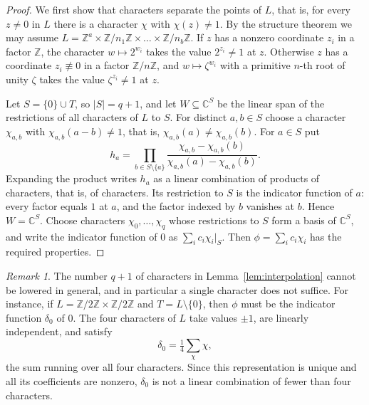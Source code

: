 \documentclass{amsart}
\theoremstyle{definition}
\theoremstyle{remark}
\newtheorem{remark}[theorem]{Remark}
\newcommand{\C}{\mathbb{C}}
\newcommand{\Z}{\mathbb{Z}}
\begin{document}
\begin{proof}
We first show that characters separate the points of $L$, that is, for every $z\ne0$ in $L$ there is a character $\chi$ with $\chi(z)\ne1$. By the structure theorem we may assume $L=\Z^a\times\Z/n_1\Z\times\dots\times\Z/n_b\Z$. If $z$ has a nonzero coordinate $z_i$ in a factor $\Z$, the character $w\mapsto2^{w_i}$ takes the value $2^{z_i}\ne1$ at $z$. Otherwise $z$ has a coordinate $z_i\not\equiv0$ in a factor $\Z/n\Z$, and $w\mapsto\zeta^{w_i}$ with a primitive $n$-th root of unity $\zeta$ takes the value $\zeta^{z_i}\ne1$ at $z$.

Let $S=\{0\}\cup T$, so $|S|=q+1$, and let $W\subseteq\C^S$ be the linear span of the restrictions of all characters of $L$ to $S$. For distinct $a,b\in S$ choose a character $\chi_{a,b}$ with $\chi_{a,b}(a-b)\ne1$, that is, $\chi_{a,b}(a)\ne\chi_{a,b}(b)$. For $a\in S$ put
\[
h_a=\prod_{b\in S\setminus\{a\}}\frac{\chi_{a,b}-\chi_{a,b}(b)}{\chi_{a,b}(a)-\chi_{a,b}(b)}.
\]
Expanding the product writes $h_a$ as a linear combination of products of characters, that is, of characters. Its restriction to $S$ is the indicator function of $a$: every factor equals $1$ at $a$, and the factor indexed by $b$ vanishes at $b$. Hence $W=\C^S$. Choose characters $\chi_0,\dots,\chi_q$ whose restrictions to $S$ form a basis of $\C^S$, and write the indicator function of $0$ as $\sum_i c_i\chi_i|_S$. Then $\phi=\sum_i c_i\chi_i$ has the required properties.
\end{proof}

\begin{remark}
The number $q+1$ of characters in Lemma~\ref{lem:interpolation} cannot be lowered in general, and in particular a single character does not suffice. For instance, if $L=\Z/2\Z\times\Z/2\Z$ and $T=L\setminus\{0\}$, then $\phi$ must be the indicator function $\delta_0$ of $0$. The four characters of $L$ take values $\pm1$, are linearly independent, and satisfy
\[
\delta_0=\tfrac14\sum_{\chi}\chi,
\]
the sum running over all four characters. Since this representation is unique and all its coefficients are nonzero, $\delta_0$ is not a linear combination of fewer than four characters.
\end{remark}
\end{document}
